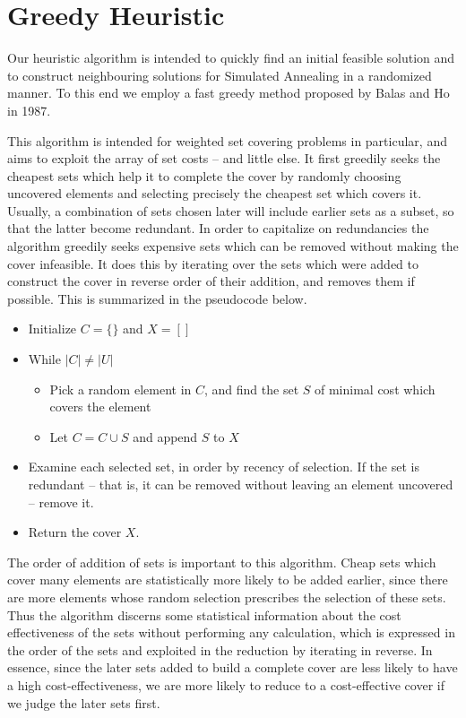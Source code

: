 \section{Greedy Heuristic}\label{sec:heur}

Our heuristic algorithm is intended to quickly find an initial feasible solution and to construct neighbouring solutions for Simulated Annealing in a randomized manner. To this end we employ a fast greedy method proposed by Balas and Ho in 1987.

This algorithm is intended for weighted set covering problems in particular, and aims to exploit the array of set costs -- and little else. It first greedily seeks the cheapest sets which help it to complete the cover by randomly choosing uncovered elements and selecting precisely the cheapest set which covers it. Usually, a combination of sets chosen later will include earlier sets as a subset, so that the latter become redundant. In order to capitalize on redundancies the algorithm greedily seeks expensive sets which can be removed without making the cover infeasible. It does this by iterating over the sets which were added to construct the cover in reverse order of their addition, and removes them if possible. This is summarized in the pseudocode below.
\begin{itemize}
    \item Initialize $C=\{\}$ and $X=[]$
    \item While $|C| \neq |U|$
    \begin{itemize}
        \item Pick a random element in $C$, and find the set $S$ of minimal cost which covers the element
        \item Let $C = C \cup S$ and append $S$ to $X$
    \end{itemize}
    \item Examine each selected set, in order by recency of selection. If the set is redundant -- that is, it can be removed without leaving an element uncovered -- remove it.
    \item Return the cover $X$.
\end{itemize}

The order of addition of sets is important to this algorithm. Cheap sets which cover many elements are statistically more likely to be added earlier, since there are more elements whose random selection prescribes the selection of these sets. Thus the algorithm discerns some statistical information about the cost effectiveness of the sets without performing any calculation, which is expressed in the order of the sets and exploited in the reduction by iterating in reverse. In essence, since the later sets added to build a complete cover are less likely to have a high cost-effectiveness, we are more likely to reduce to a cost-effective cover if we judge the later sets first.

